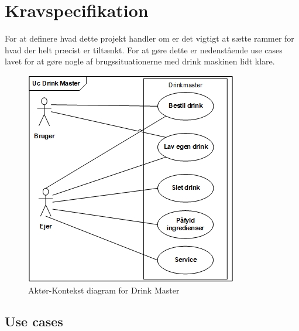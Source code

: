 \chapter{Kravspecifikation}

For at definere hvad dette projekt handler om er det vigtigt at sætte rammer for hvad der helt præcist er tiltænkt. For at gøre dette er nedenstående use cases lavet for at gøre nogle af brugssituationerne med drink maskinen lidt klare.

\begin{figure}[H]
	\centering
	\includegraphics[scale=1.2]{Images/UC_diagram_JPEG.jpg}
	\caption{Aktør-Kontekst diagram for Drink Master}
	\label{fig:uc_actor_context}
\end{figure}
\FloatBarrier

\newpage
\section{Use cases}
